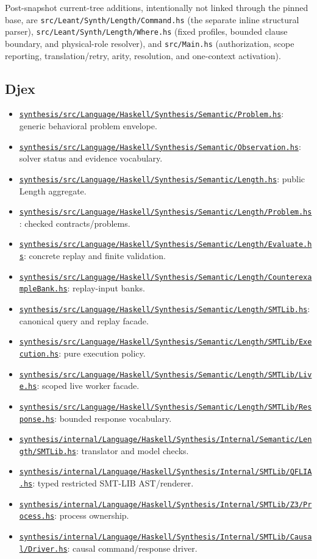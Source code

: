 \documentclass[10pt,letterpaper,oneside]{report}
\newcommand{\code}[1]{\texttt{\detokenize{#1}}}
\newcommand{\filepath}[1]{\nolinkurl{#1}}
\def\DjexPinnedCommit{7d65eba6f753727ae7b3d734fb4a7e00f1f44aa7}
\def\DjexBase{https://github.com/VladimirReshetnikov/Djex/blob/\DjexPinnedCommit/}
\newcommand{\dpath}[1]{\href{\DjexBase#1}{\nolinkurl{#1}}}
\begin{document}
Post-snapshot current-tree additions, intentionally not linked through the
pinned base, are \filepath{src/Leant/Synth/Length/Command.hs} (the separate
inline structural parser), \filepath{src/Leant/Synth/Length/Where.hs} (fixed
profiles, bounded clause boundary, and physical-role resolver), and
\filepath{src/Main.hs} (authorization, scope reporting, translation/retry,
\code{SlotArrow} arity, resolution, and one-context activation).

\subsection{Djex}

\begin{itemize}
\item \dpath{synthesis/src/Language/Haskell/Synthesis/Semantic/Problem.hs}: generic behavioral problem envelope.
\item \dpath{synthesis/src/Language/Haskell/Synthesis/Semantic/Observation.hs}: solver status and evidence vocabulary.
\item \dpath{synthesis/src/Language/Haskell/Synthesis/Semantic/Length.hs}: public Length aggregate.
\item \dpath{synthesis/src/Language/Haskell/Synthesis/Semantic/Length/Problem.hs}: checked contracts/problems.
\item \dpath{synthesis/src/Language/Haskell/Synthesis/Semantic/Length/Evaluate.hs}: concrete replay and finite validation.
\item \dpath{synthesis/src/Language/Haskell/Synthesis/Semantic/Length/CounterexampleBank.hs}: replay-input banks.
\item \dpath{synthesis/src/Language/Haskell/Synthesis/Semantic/Length/SMTLib.hs}: canonical query and replay facade.
\item \dpath{synthesis/src/Language/Haskell/Synthesis/Semantic/Length/SMTLib/Execution.hs}: pure execution policy.
\item \dpath{synthesis/src/Language/Haskell/Synthesis/Semantic/Length/SMTLib/Live.hs}: scoped live worker facade.
\item \dpath{synthesis/src/Language/Haskell/Synthesis/Semantic/Length/SMTLib/Response.hs}: bounded response vocabulary.
\item \dpath{synthesis/internal/Language/Haskell/Synthesis/Internal/Semantic/Length/SMTLib.hs}: translator and model checks.
\item \dpath{synthesis/internal/Language/Haskell/Synthesis/Internal/SMTLib/QFLIA.hs}: typed restricted SMT-LIB AST/renderer.
\item \dpath{synthesis/internal/Language/Haskell/Synthesis/Internal/SMTLib/Z3/Process.hs}: process ownership.
\item \dpath{synthesis/internal/Language/Haskell/Synthesis/Internal/SMTLib/Causal/Driver.hs}: causal command/response driver.
\end{itemize}
\end{document}
